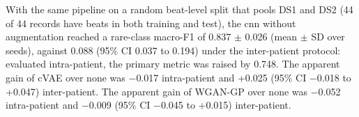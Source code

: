 With the same pipeline on a random beat-level split that pools DS1 and DS2 (44 of 44 records have beats in both training and test), the cnn without augmentation reached a rare-class macro-F1 of 0.837 $\pm$ 0.026 (mean $\pm$ SD over seeds), against 0.088 (95\% CI 0.037 to 0.194) under the inter-patient protocol: evaluated intra-patient, the primary metric was raised by 0.748. The apparent gain of cVAE over none was $-$0.017 intra-patient and +0.025 (95\% CI $-$0.018 to +0.047) inter-patient. The apparent gain of WGAN-GP over none was $-$0.052 intra-patient and $-$0.009 (95\% CI $-$0.045 to +0.015) inter-patient.
